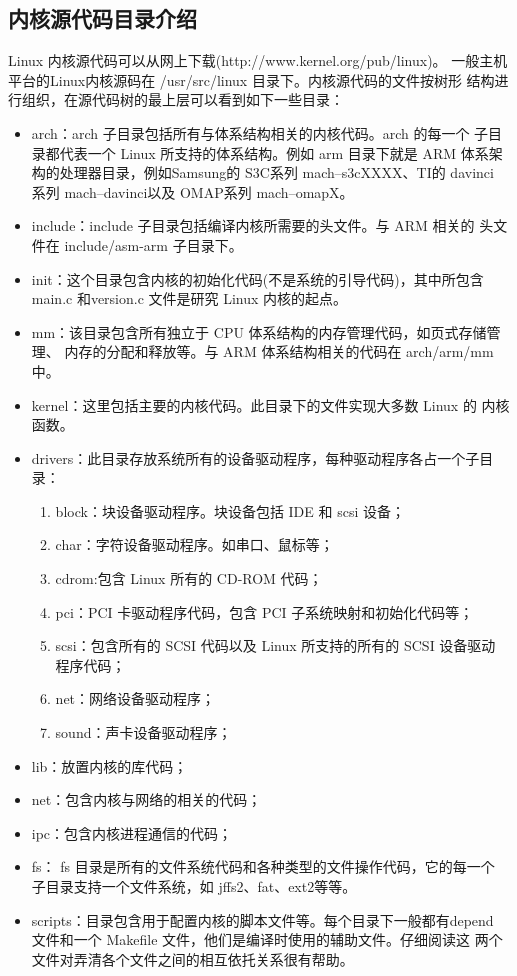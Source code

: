 \subsection{内核源代码目录介绍}
	Linux 内核源代码可以从网上下载(http://www.kernel.org/pub/linux)。
一般主机平台的Linux内核源码在 /usr/src/linux 目录下。内核源代码的文件按树形
结构进行组织，在源代码树的最上层可以看到如下一些目录：
\begin{itemize}\itemsep=-3pt
  \item arch：arch 子目录包括所有与体系结构相关的内核代码。arch 的每一个
		子目录都代表一个 Linux 所支持的体系结构。例如 arm 目录下就是 ARM
		体系架构的处理器目录，例如Samsung的 S3C系列 mach--s3cXXXX、TI的
		davinci 系列 mach--davinci以及 OMAP系列 mach--omapX。
  \item include：include 子目录包括编译内核所需要的头文件。与 ARM 相关的
		头文件在 include/asm-arm 子目录下。
  \item init：这个目录包含内核的初始化代码(不是系统的引导代码)，其中所包含
		main.c 和version.c 文件是研究 Linux 内核的起点。
  \item mm：该目录包含所有独立于 CPU 体系结构的内存管理代码，如页式存储管理、
		内存的分配和释放等。与 ARM 体系结构相关的代码在 arch/arm/mm 中。
  \item kernel：这里包括主要的内核代码。此目录下的文件实现大多数 Linux 的
		内核函数。
  \item drivers：此目录存放系统所有的设备驱动程序，每种驱动程序各占一个子目录：
  \begin{enumerate}\itemsep=-3pt
  \item block：块设备驱动程序。块设备包括 IDE 和 scsi 设备；
  \item char：字符设备驱动程序。如串口、鼠标等；
  \item cdrom:包含 Linux 所有的 CD-ROM 代码；
  \item pci：PCI 卡驱动程序代码，包含 PCI 子系统映射和初始化代码等；
  \item scsi：包含所有的 SCSI 代码以及 Linux 所支持的所有的 SCSI 设备驱动
		程序代码；
  \item net：网络设备驱动程序；
  \item sound：声卡设备驱动程序；
  \end{enumerate}
  \item lib：放置内核的库代码；
  \item net：包含内核与网络的相关的代码；
  \item ipc：包含内核进程通信的代码；
  \item fs： fs 目录是所有的文件系统代码和各种类型的文件操作代码，它的每一个
		子目录支持一个文件系统，如 jffs2、fat、ext2等等。
  \item scripts：目录包含用于配置内核的脚本文件等。每个目录下一般都有depend
		文件和一个 Makefile 文件，他们是编译时使用的辅助文件。仔细阅读这
		两个文件对弄清各个文件之间的相互依托关系很有帮助。
\end{itemize}

